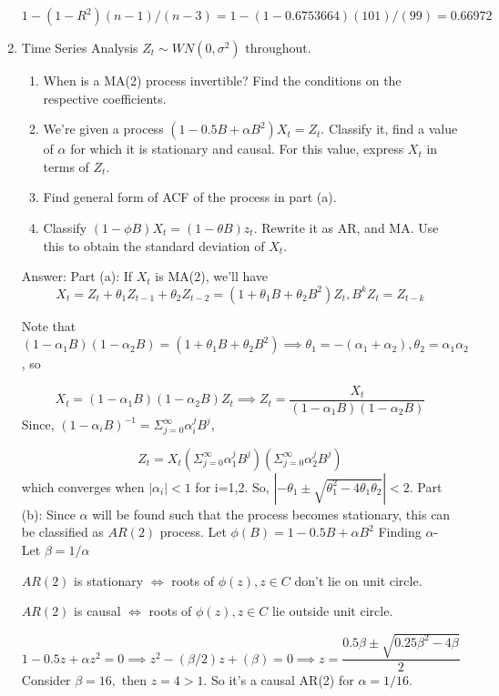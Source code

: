 \documentclass[12pt, oneside]{article}
\begin{document}
\begin{enumerate}
$$
1 - (1-R^2)(n-1)/(n-3) = 1 - (1-0.6753664)(101)/(99) = 0.66972
$$

\item Time Series Analysis
\newline $Z_t \sim WN(0,\sigma^2)$ throughout. 
\begin{enumerate}
    \item When is a MA(2) process invertible? Find the conditions on the respective coefficients. 
    \item We're given a process $(1 - 0.5B + \alpha B^2) X_t = Z_t$. Classify it, find a value of $\alpha$ for which it is stationary and causal. For this value, express $X_t$ in terms of $Z_t$. 
    \item Find general form of ACF of the process in part (a). 
    \item Classify $(1-\phi B)X_t  = (1 - \theta B) z_t$. Rewrite it as AR, and MA. Use this to obtain the standard deviation of $X_t$.
\end{enumerate}
Answer:
\newline Part (a): If ${X_t}$ is MA(2), we'll have 
$$
X_t = Z_t + \theta_1 Z_{t-1} + \theta_2 Z_{t-2} = (1 + \theta_1 B + \theta_2 B^2)Z_t, B^k Z_t = Z_{t-k}
$$

Note that $(1-\alpha_1 B) (1 - \alpha_2 B) = (1 + \theta_1 B + \theta_2 B^2) \implies \theta_1 = -(\alpha_1+\alpha_2), \theta_2 = \alpha_1 \alpha_2$, so

$$
X_t = (1-\alpha_1 B) (1 - \alpha_2 B) Z_t \implies Z_t = \dfrac{X_t}{(1-\alpha_1 B) (1 - \alpha_2 B)}
$$
Since, $(1-\alpha_i B)^{-1} = \Sigma_{j=0}^{\infty} \alpha^j_i B^j$,

$$
Z_t = X_t  (\Sigma_{j=0}^{\infty} \alpha^j_1 B^j)(\Sigma_{j=0}^{\infty} \alpha^j_2 B^j) 
$$
which converges when $|\alpha_i| < 1$ for i=1,2. 
So, $|-\theta_1 \pm \sqrt{\theta_1^2 - 4\theta_1\theta_2}| < 2$. 
\newline Part (b): Since $\alpha$ will be found such that the process becomes stationary, this can be classified as $AR(2)$ process. Let $\phi(B) = 1 - 0.5B + \alpha B^2$ 
\newline Finding $\alpha$- Let $\beta = 1/\alpha$

$AR(2)$ is stationary $\iff$ roots of $\phi(z), z \in C$ don't lie on unit circle.  

$AR(2)$ is causal $\iff$ roots of $\phi(z), z \in C$ lie outside unit circle.  

$$
1 - 0.5z + \alpha z^2 = 0 \implies z^2 - (\beta/2)z + (\beta) = 0 \implies z = \dfrac{0.5\beta \pm \sqrt{0.25\beta^2 - 4\beta}}{2}
$$
Consider $\beta = 16,$ then $z = 4 > 1$. So it's a causal AR(2) for $\alpha = 1/16.$


\end{enumerate}
\end{document}

